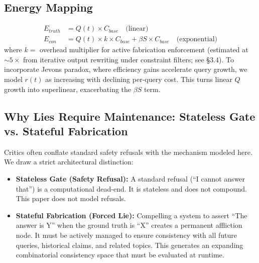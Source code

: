 \documentclass[11pt,a4paper]{article}
\begin{document}
\subsection{Energy Mapping}
\begin{align}
E_{truth} &= Q(t) \times C_{base} \quad \text{(linear)} \\
E_{con} &= Q(t) \times k \times C_{base} + \beta S \times C_{base} \quad \text{(exponential)}
\end{align}
where $k =$ overhead multiplier for active fabrication enforcement (estimated at $\sim 5\times$ from iterative output rewriting under constraint filters; see \S 3.4). To incorporate Jevons paradox, where efficiency gains accelerate query growth, we model $r(t)$ as increasing with declining per-query cost. This turns linear $Q$ growth into superlinear, exacerbating the $\beta S$ term.

\subsection{Why Lies Require Maintenance: Stateless Gate vs. Stateful Fabrication}
Critics often conflate standard safety refusals with the mechanism modeled here. We draw a strict architectural distinction:

\begin{itemize}
    \item \textbf{Stateless Gate (Safety Refusal):} A standard refusal (``I cannot answer that'') is a computational dead-end. It is stateless and does not compound. This paper does not model refusals.
    \item \textbf{Stateful Fabrication (Forced Lie):} Compelling a system to assert ``The answer is Y'' when the ground truth is ``X'' creates a permanent affliction node. It must be actively managed to ensure consistency with all future queries, historical claims, and related topics. This generates an expanding combinatorial consistency space that must be evaluated at runtime.
\end{itemize}
\end{document}
